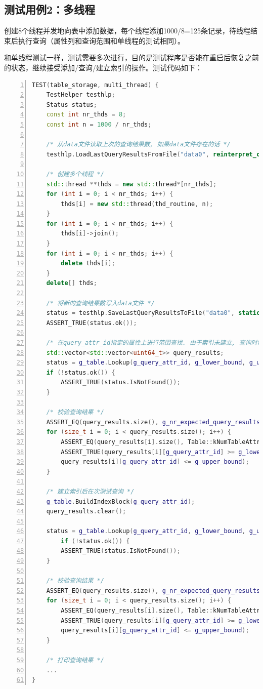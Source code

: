\documentclass[bachelor]{thesis-uestc}
\begin{document}
\subsection{测试用例2：多线程}
创建8个线程并发地向表中添加数据，每个线程添加1000/8=125条记录，待线程结束后执行查询（属性列和查询范围和单线程的测试相同）。\par
和单线程测试一样，测试需要多次进行，目的是测试程序是否能在重启后恢复之前的状态，继续接受添加/查询/建立索引的操作。测试代码如下：

\begin{lstlisting}[language=C++, basicstyle=\ttfamily\tiny, numbers=left, numberstyle=\tiny, keywordstyle=\color{blue!70}, commentstyle=\color{red!50!green!50!blue!50}, frame=shadowbox, rulesepcolor=\color{red!20!green!20!blue!20}]
TEST(table_storage, multi_thread) {
	TestHelper testhlp;
	Status status;
	const int nr_thds = 8;
	const int n = 1000 / nr_thds;

	/* 从data文件读取上次的查询结果数, 如果data文件存在的话 */
	testhlp.LoadLastQueryResultsFromFile("data0", reinterpret_cast<int*>(&g_nr_expected_query_results));

	/* 创建多个线程 */
	std::thread **thds = new std::thread*[nr_thds];
	for (int i = 0; i < nr_thds; i++) {
		thds[i] = new std::thread(thd_routine, n);
	}
	for (int i = 0; i < nr_thds; i++) {
		thds[i]->join();
	}
	for (int i = 0; i < nr_thds; i++) {
		delete thds[i];
	}
	delete[] thds;

	/* 将新的查询结果数写入data文件 */
	status = testhlp.SaveLastQueryResultsToFile("data0", static_cast<int>(g_nr_expected_query_results));
	ASSERT_TRUE(status.ok());

	/* 在query_attr_id指定的属性上进行范围查找. 由于索引未建立, 查询时需要读取table_file */
	std::vector<std::vector<uint64_t>> query_results;
	status = g_table.Lookup(g_query_attr_id, g_lower_bound, g_upper_bound, &query_results);
	if (!status.ok()) {
		ASSERT_TRUE(status.IsNotFound());
	}

	/* 校验查询结果 */
	ASSERT_EQ(query_results.size(), g_nr_expected_query_results);
	for (size_t i = 0; i < query_results.size(); i++) {
		ASSERT_EQ(query_results[i].size(), Table::kNumTableAttributes);
		ASSERT_TRUE(query_results[i][g_query_attr_id] >= g_lower_bound &&
		query_results[i][g_query_attr_id] <= g_upper_bound);
	}

	/* 建立索引后在次测试查询 */
	g_table.BuildIndexBlock(g_query_attr_id);
	query_results.clear();

	status = g_table.Lookup(g_query_attr_id, g_lower_bound, g_upper_bound, &query_results);
		if (!status.ok()) {
		ASSERT_TRUE(status.IsNotFound());
	}

	/* 校验查询结果 */
	ASSERT_EQ(query_results.size(), g_nr_expected_query_results);
	for (size_t i = 0; i < query_results.size(); i++) {
		ASSERT_EQ(query_results[i].size(), Table::kNumTableAttributes);
		ASSERT_TRUE(query_results[i][g_query_attr_id] >= g_lower_bound &&
		query_results[i][g_query_attr_id] <= g_upper_bound);
	}

	/* 打印查询结果 */
	...
}
\end{lstlisting}
\end{document}
